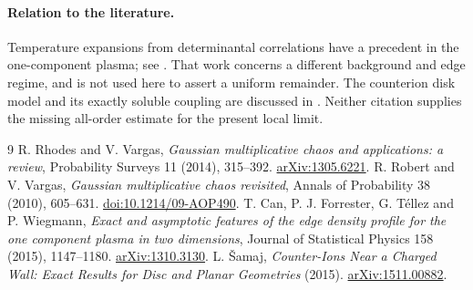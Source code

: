 \documentclass[11pt]{article}
\theoremstyle{remark}\newtheorem{remark}[theorem]{Remark}
\begin{document}
\paragraph{Relation to the literature.}
Temperature expansions from determinantal correlations have a precedent
in the one-component plasma; see \cite{Can}. That work concerns a
different background and edge regime, and is not used here to assert
a uniform remainder. The counterion disk model and its exactly soluble
coupling are discussed in \cite{Samaj}. Neither citation supplies the
missing all-order estimate for the present local limit.

\begin{thebibliography}{9}
 R. Rhodes and V. Vargas, \emph{Gaussian multiplicative chaos and
applications: a review}, Probability Surveys 11 (2014), 315--392.
\href{https://arxiv.org/abs/1305.6221}{arXiv:1305.6221}.
 R. Robert and V. Vargas, \emph{Gaussian multiplicative
chaos revisited}, Annals of Probability 38 (2010), 605--631.
\href{https://doi.org/10.1214/09-AOP490}{doi:10.1214/09-AOP490}.
 T. Can, P. J. Forrester, G. T\'ellez and P. Wiegmann,
\emph{Exact and asymptotic features of the edge density profile for the one
component plasma in two dimensions}, Journal of Statistical Physics 158
(2015), 1147--1180.
\href{https://arxiv.org/abs/1310.3130}{arXiv:1310.3130}.
 L. \v Samaj, \emph{Counter-Ions Near a Charged Wall:
Exact Results for Disc and Planar Geometries} (2015).
\href{https://arxiv.org/abs/1511.00882}{arXiv:1511.00882}.
\end{thebibliography}
\end{document}
